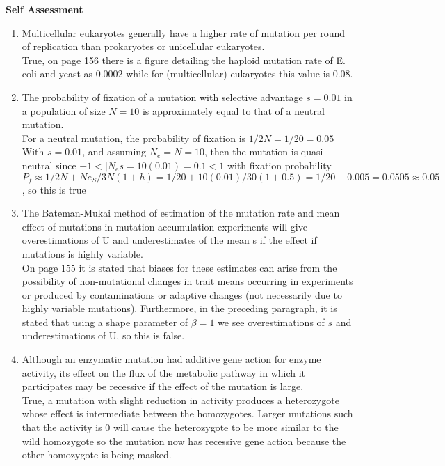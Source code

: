 \documentclass[12pt]{amsart}
\begin{document}
{\large \bf Self Assessment}
\begin{enumerate}
\item Multicellular eukaryotes generally have a higher rate of mutation per round of replication than prokaryotes or unicellular eukaryotes.\\
True, on page 156 there is a figure detailing the haploid mutation rate of E. coli and yeast as 0.0002 while for (multicellular) eukaryotes this value is 0.08.\\
\item The probability of fixation of a mutation with selective advantage $s = 0.01$ in a population of size $N = 10$ is approximately equal to that of a neutral mutation.\\
For a neutral mutation, the probability of fixation is $1/2N = 1/20 = 0.05$ With $s = 0.01$, and assuming $N_e = N = 10$, then the mutation is quasi-neutral since $-1 < |N_es = 10(0.01)=0.1<1$ with fixation probability $P_f \approx 1/2N + Ne_S/3N(1+h) = 1/20+10(0.01)/30(1+0.5) = 1/20+0.005 = 0.0505 \approx 0.05$, so this is true\\
\item The Bateman-Mukai method of estimation of the mutation rate and mean effect of mutations in mutation accumulation experiments will give overestimations of U and underestimates of the mean s if the effect if mutations is highly variable.\\
On page 155 it is stated that biases for these estimates can arise from the possibility of non-mutational changes in trait means occurring in experiments or produced by contaminations or adaptive changes (not necessarily due to highly variable mutations). Furthermore, in the preceding paragraph, it is stated that using a shape parameter of $\beta = 1$ we see overestimations of $\bar{s}$ and underestimations of U, so this is false.\\
\item Although an enzymatic mutation had additive gene action for enzyme activity, its effect on the flux of the metabolic pathway in which it participates may be recessive if the effect of the mutation is large.\\
True, a mutation with slight reduction in activity produces a heterozygote whose effect is intermediate between the homozygotes. Larger mutations such that the activity is 0 will cause the heterozygote to be more similar to the wild homozygote so the mutation now has recessive gene action because the other homozygote is being masked.\\

\end{enumerate}
\end{document}
